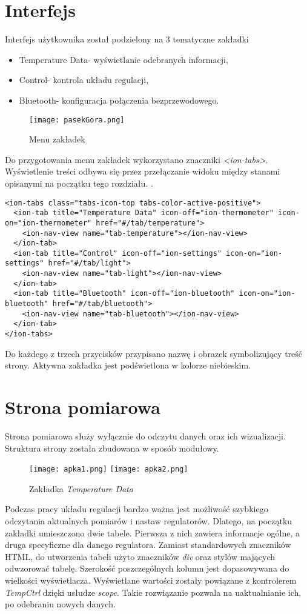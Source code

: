 \section{Interfejs}%
Interfejs użytkownika został podzielony na 3 tematyczne zakładki
\begin{itemize}
\item Temperature Data- wyświetlanie odebranych informacji,
\item Control- kontrola układu regulacji,
\item Bluetooth- konfiguracja połączenia bezprzewodowego.
\end{itemize}
\begin{figure}[H]
	\centering
	\texttt{[image: pasekGora.png]}
	\caption{Menu zakładek}
\end{figure}
Do przygotowania menu zakładek wykorzystano znaczniki \textit{<ion-tabs>}. Wyświetlenie treści odbywa się przez przełączanie widoku między stanami opisanymi na początku tego rozdziału.
\lstset{language=HTML}.
\begin{lstlisting}
<ion-tabs class="tabs-icon-top tabs-color-active-positive">
  <ion-tab title="Temperature Data" icon-off="ion-thermometer" icon-on="ion-thermometer" href="#/tab/temperature">
    <ion-nav-view name="tab-temperature"></ion-nav-view>
  </ion-tab>
  <ion-tab title="Control" icon-off="ion-settings" icon-on="ion-settings" href="#/tab/light">
    <ion-nav-view name="tab-light"></ion-nav-view>
  </ion-tab>
  <ion-tab title="Bluetooth" icon-off="ion-bluetooth" icon-on="ion-bluetooth" href="#/tab/bluetooth">
    <ion-nav-view name="tab-bluetooth"></ion-nav-view>
  </ion-tab>
</ion-tabs>
\end{lstlisting}
Do każdego z trzech przycisków przypisano nazwę i obrazek symbolizujący treść strony. Aktywna zakładka jest podświetlona w kolorze niebieskim.
\section{Strona pomiarowa}%
Strona pomiarowa służy wyłącznie do odczytu danych oraz ich wizualizacji. Struktura strony została zbudowana w sposób modułowy.
\begin{figure}[H]
	\centering
	\texttt{[image: apka1.png]}
	\texttt{[image: apka2.png]}
	\caption{Zakładka \textit{Temperature Data}}
\end{figure}
Podczas pracy układu regulacji bardzo ważna jest możliwość szybkiego odczytania aktualnych pomiarów i nastaw regulatorów. Dlatego, na początku zakładki umieszczono dwie tabele. Pierwsza z nich zawiera informacje ogólne, a druga specyficzne dla danego regulatora. Zamiast standardowych znaczników HTML, do utworzenia tabeli użyto znaczników \textit{div} oraz stylów mających odwzorować tabelę. Szerokość poszczególnych kolumn jest dopasowywana do wielkości wyświetlacza. Wyświetlane wartości zostały powiązane z kontrolerem \textit{TempCtrl} dzięki usłudze \textit{scope}. Takie rozwiązanie pozwala na uaktualnianie ich, po odebraniu nowych danych. 

